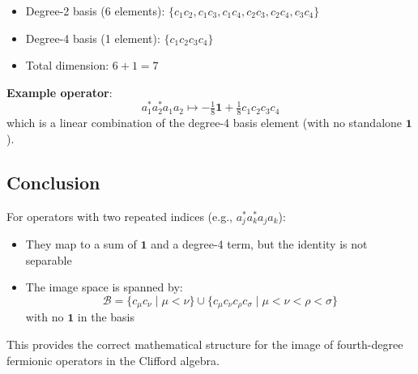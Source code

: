 \documentclass{article}
\begin{document}
\begin{itemize}
\item Degree-2 basis (6 elements):
$\{c_1c_2, c_1c_3, c_1c_4, c_2c_3, c_2c_4, c_3c_4\}$
\item Degree-4 basis (1 element):
$\{c_1c_2c_3c_4\}$
\item Total dimension: $6 + 1 = 7$
\end{itemize}

\textbf{Example operator}:
\[
a_1^* a_2^* a_1 a_2 \mapsto -\tfrac{1}{8}\mathbf{1} + \tfrac{1}{8}c_1c_2c_3c_4
\]
which is a linear combination of the degree-4 basis element (with no standalone $\mathbf{1}$).

\subsection*{Conclusion}

For operators with two repeated indices (e.g., $a_j^* a_k^* a_j a_k$):
\begin{itemize}
\item They map to a sum of $\mathbf{1}$ and a degree-4 term, but the identity is not separable
\item The image space is spanned by:
\[
\mathcal{B} = \{c_\mu c_\nu \mid \mu < \nu\} \cup \{c_\mu c_\nu c_\rho c_\sigma \mid \mu < \nu < \rho < \sigma\}
\]
with no $\mathbf{1}$ in the basis
\end{itemize}

This provides the correct mathematical structure for the image of fourth-degree fermionic operators in the Clifford algebra.
\end{document}
